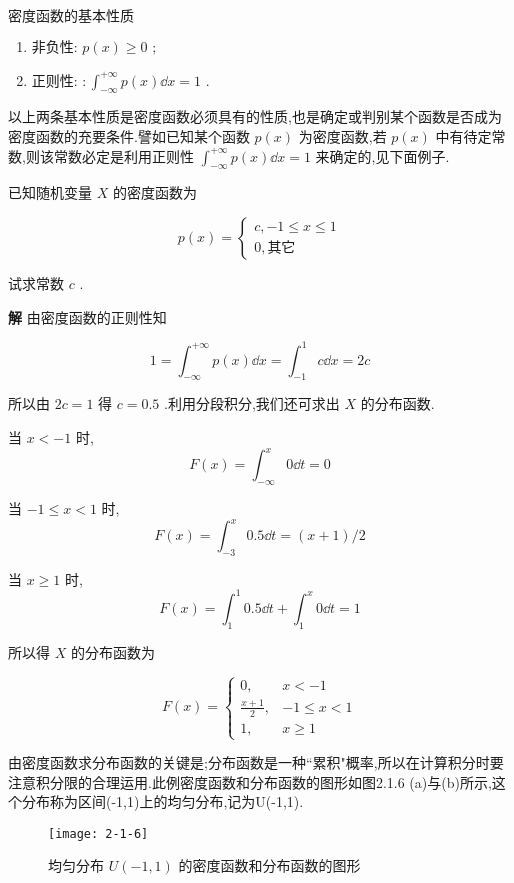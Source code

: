  $ 密度函数的基本性质 $ 
\begin{enumerate}
\item 非负性: $ p(x) \geqslant 0 $ ;
\item 正则性: $ : \int_{-\infty}^{+\infty} p(x) \dd x=1 $ .
\end{enumerate}

以上两条基本性质是密度函数必须具有的性质,也是确定或判别某个函数是否成为密度函数的充要条件.譬如已知某个函数 $ p(x) $ 为密度函数,若 $ p(x) $ 中有待定常数,则该常数必定是利用正则性 $ \int_{-\infty}^{+\infty} p(x) \dd x=1 $ 来确定的,见下面例子.

\begin{example}\label{exam:2.1.7}
	已知随机变量 $ X $ 的密度函数为
	
	\[ 
	p(x)=\left\{\begin{array}{ll}
	{c,-1 \leqslant x \leqslant 1} \\ 
	{0,\text{其它}}
	\end{array}\right.
	\]
	
	试求常数 $ c $ .
	
	\textbf{解} 由密度函数的正则性知
	
	\[ 
	1=\int_{-\infty}^{+\infty} p(x) \dd x=\int_{-1}^{1} c \dd x=2 c
	\]
	
	所以由 $ 2c=1 $ 得 $ c=0.5 $ .利用分段积分,我们还可求出 $ X $ 的分布函数.
	
	当 $ x<-1 $ 时,
	\[ 
	F(x)=\int_{-\infty}^{x} 0 \dd t=0
	\]
	
	当 $ -1 \leqslant x<1 $ 时,
	\[ 
	F(x)=\int_{-3}^{x} 0.5 \dd t=(x+1) / 2
	\]
	
	当 $ x \geqslant 1 $ 时,
	\[ 
	F(x)=\int_{1}^{1} 0.5 \dd t+\int_{1}^{x} 0 \dd t=1
	\]
	
	所以得 $ X $ 的分布函数为
	
	\[ 
	F(x)=\left\{\begin{array}{ll}
	{0,} & {x<-1} \\ 
	{\frac{x+1}{2},} & {-1 \leqslant x<1} \\ 
	{1,} & {x \geqslant 1}
	\end{array}\right.
	\]
	
\end{example}


由密度函数求分布函数的关键是;分布函数是一种``累积"概率,所以在计算积分时要注意积分限的合理运用.此例密度函数和分布函数的图形如图2.1.6
(a)与(b)所示,这个分布称为区间(-1,1)上的均匀分布,记为U(-1,1).

\begin{figure}
	\centering
	\texttt{[image: 2-1-6]}
	\caption{均匀分布 $ U(-1,1) $ 的密度函数和分布函数的图形}
	\label{fig:2.1.6}
\end{figure}

